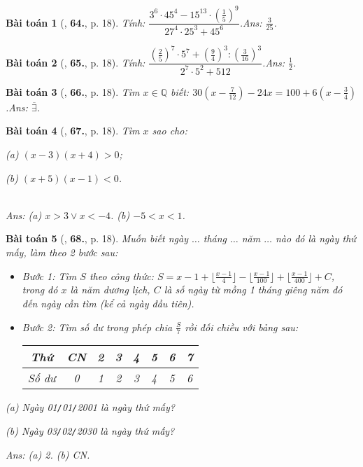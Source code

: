 \documentclass{article}
\numberwithin{equation}{section}
\newtheorem{baitoan}{Bài toán}
\begin{document}
\begin{baitoan}[\cite{Tuyen_Toan_7}, \textbf{64.}, p. 18]
	Tính: $\dfrac{3^6\cdot 45^4 - 15^{13}\cdot\left(\frac{1}{5}\right)^9}{27^4\cdot 25^3 + 45^6}$.\hfill\textsf{Ans:} $\frac{3}{25}$.
\end{baitoan}
	
\begin{baitoan}[\cite{Tuyen_Toan_7}, \textbf{65.}, p. 18]
	Tính: $\dfrac{\left(\frac{2}{5}\right)^7\cdot 5^7 + \left(\frac{9}{4}\right)^3:\left(\frac{3}{16}\right)^3}{2^7\cdot 5^2 + 512}$.\hfill\textsf{Ans:} $\frac{1}{2}$.
\end{baitoan}

\begin{baitoan}[\cite{Tuyen_Toan_7}, \textbf{66.}, p. 18]
	Tìm $x\in\mathbb{Q}$ biết: $30\left(x - \frac{7}{12}\right) - 24x = 100 + 6\left(x - \frac{3}{4}\right)$.\hfill\textsf{Ans:} $\overline{\exists}$.
\end{baitoan}

\begin{baitoan}[\cite{Tuyen_Toan_7}, \textbf{67.}, p. 18]
	Tìm $x$ sao cho:
	\begin{enumerate*}
		\item[(a)] $(x - 3)(x + 4) > 0$;
		\item[(b)] $(x + 5)(x - 1) < 0$.
	\end{enumerate*}\\\mbox{}\hfill\textsf{Ans:} (a) $x > 3\lor x < -4$. (b) $-5 < x < 1$.
\end{baitoan}

\begin{baitoan}[\cite{Tuyen_Toan_7}, \textbf{68.}, p. 18]
	Muốn biết ngày $\ldots$ tháng $\ldots$ năm $\ldots$ nào đó là ngày thứ mấy, làm theo 2 bước sau:
	\begin{itemize}
		\item \textit{Bước 1}: Tìm $S$ theo công thức: $S = x - 1 + \lfloor\frac{x - 1}{4}\rfloor -  \lfloor\frac{x - 1}{100}\rfloor + \lfloor\frac{x - 1}{400}\rfloor + C$, trong đó $x$ là năm dương lịch, $C$ là số ngày từ mồng 1 tháng giêng năm đó đến ngày cần tìm (kể cả ngày đầu tiên).
		\item \textit{Bước 2}: Tìm số dư trong phép chia $\frac{S}{7}$ rồi đối chiều với bảng sau:
		
		\begin{table}[H]
			\centering
			\begin{tabular}{|c|c|c|c|c|c|c|c|}
				\hline
				Thứ & CN & 2 & 3 & 4 & 5 & 6 & 7 \\
				\hline
				Số dư & 0 & 1 & 2 & 3 & 4 & 5 & 6 \\
				\hline
			\end{tabular}
		\end{table}
	\end{itemize}
	\begin{enumerate*}
		\item[(a)] Ngày \emph{01\texttt{/}01\texttt{/}2001} là ngày thứ mấy?
		\item[(b)] Ngày \emph{03\texttt{/}02\texttt{/}2030} là ngày thứ mấy?
	\end{enumerate*}\hfill\textsf{Ans:} (a) 2. (b) CN.
\end{baitoan}


\printbibliography[heading=bibintoc]
	
\end{document}

